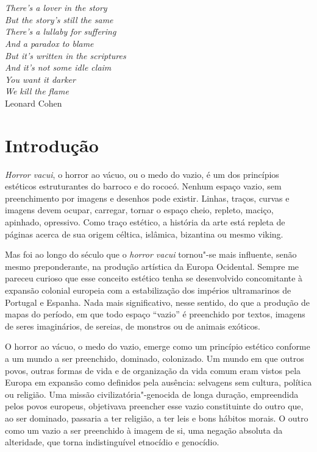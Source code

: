 \chapter*{}
\thispagestyle{empty}
\begin{vplace}[30]
\begin{flushright}
\emph{There's a lover in the story\\
But the story's still the same\\
There's a lullaby for suffering\\
And a paradox to blame\\
But it's written in the scriptures\\
And it's not some idle claim\\
You want it darker\\
We kill the flame}\\[5pt]
Leonard Cohen 
\end{flushright}
\end{vplace}

\chapter{Introdução}


\emph{Horror vacui}, o horror ao vácuo, ou o medo do vazio, é um dos
princípios estéticos estruturantes do barroco e do rococó. Nenhum espaço
vazio, sem preenchimento por imagens e desenhos pode existir. Linhas,
traços, curvas e imagens devem ocupar, carregar, tornar o espaço cheio,
repleto, maciço, apinhado, opressivo. Como traço estético, a história da
arte está repleta de páginas acerca de sua origem céltica, islâmica,
bizantina ou mesmo viking.

Mas foi ao longo do século  que o \emph{horror vacui} tornou"-se mais
influente, senão mesmo preponderante, na produção artística da Europa
Ocidental. Sempre me pareceu curioso que esse conceito estético tenha se
desenvolvido concomitante à expansão colonial europeia com a
estabilização dos impérios ultramarinos de Portugal e Espanha. Nada mais
significativo, nesse sentido, do que a produção de mapas do período, em
que todo espaço ``vazio'' é preenchido por textos, imagens de seres
imaginários, de sereias, de monstros ou de animais exóticos.

O horror ao vácuo, o medo do vazio, emerge como um princípio estético
conforme a um mundo a ser preenchido, dominado, colonizado. Um mundo em
que outros povos, outras formas de vida e de organização da vida comum
eram vistos pela Europa em expansão como definidos pela ausência:
selvagens sem cultura, política ou religião. Uma missão
civilizatória"-genocida de longa duração, empreendida pelos povos
europeus, objetivava preencher esse vazio constituinte do outro que, ao
ser dominado, passaria a ter religião, a ter leis e bons hábitos morais.
O outro como um vazio a ser preenchido à imagem de si, uma negação
absoluta da alteridade, que torna indistinguível etnocídio e genocídio.

